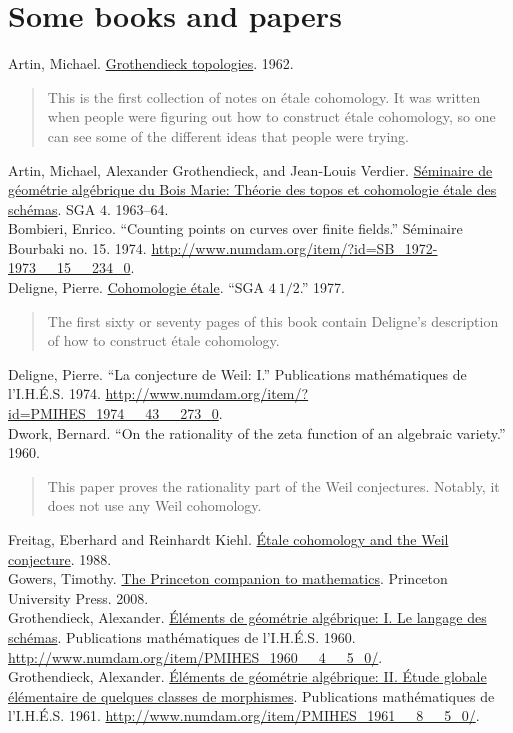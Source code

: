\documentclass [11 pt, oneside] {article}
\begin{document}
\section{Some books and papers}
{\small
    Artin, Michael. \ul{Grothendieck topologies}. 1962.
    \begin{quote} %
		\footnotesize This is the first collection of notes on \'etale cohomology. It was written when people were figuring out how to construct \'etale cohomology, so one can see some of the different ideas that people were trying.
	\end{quote}
    Artin, Michael, Alexander Grothendieck, and Jean-Louis Verdier. \ul{S\'eminaire de g\'eom\'etrie alg\'ebrique du Bois Marie: Th\'eorie des topos et cohomologie \'etale des sch\'emas}. SGA $4$. 1963--64. 
    	\\[1 em]
    Bombieri, Enrico. ``Counting points on curves over finite fields.'' S\'eminaire Bourbaki no. 15. 1974. \url{http://www.numdam.org/item/?id=SB_1972-1973__15__234_0}.
    	\\[1 em]
    Deligne, Pierre. \ul{Cohomologie \'etale}. ``SGA $4\ 1/2$.'' 1977.
	\begin{quote}
		\footnotesize The first sixty or seventy pages of this book contain Deligne's description of how to construct \'etale cohomology.
	\end{quote}
    Deligne, Pierre. ``La conjecture de Weil: I.'' Publications math\'ematiques de l'I.H.\'E.S. 1974. \url{http://www.numdam.org/item/?id=PMIHES_1974__43__273_0}.
    	\\[1 em]
    Dwork, Bernard. ``On the rationality of the zeta function of an algebraic variety.'' 1960.
        	\begin{quote}
		\footnotesize This paper proves the rationality part of the Weil conjectures. Notably, it does not use any Weil cohomology.
	\end{quote}
    Freitag, Eberhard and Reinhardt Kiehl. \ul{\'Etale cohomology and the Weil conjecture}. 1988.
    	\\[1 em]
    Gowers, Timothy. \underline{The Princeton companion to mathematics}. Princeton University Press. 2008.
    	\\[1 em]
    Grothendieck, Alexander. \ul{\'El\'ements de g\'eom\'etrie alg\'ebrique: I. Le langage des sch\'emas}. Publications math\'ematiques de l'I.H.\'E.S. 1960. \url{http://www.numdam.org/item/PMIHES_1960__4__5_0/}.
    	\\[1 em]
    Grothendieck, Alexander. \ul{\'El\'ements de g\'eom\'etrie alg\'ebrique: II. \'Etude globale \'el\'ementaire de quelques classes de morphismes}. Publications math\'ematiques de l'I.H.\'E.S. 1961. \url{http://www.numdam.org/item/PMIHES_1961__8__5_0/}.
}
\end{document}
